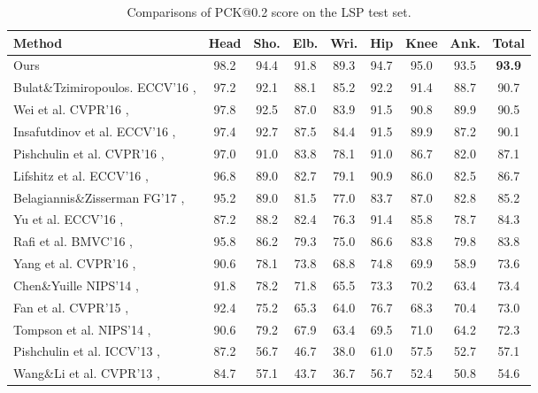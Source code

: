 \documentclass[journal ]{IEEEtran}
\begin{document}
\begin{table*}[t]
	\footnotesize
\tabcolsep=0.2cm
	\begin{center}
		\begin{tabular}{l c c c c c c c c}
			\hline 
			Method & Head & Sho. & Elb. & Wri. & Hip & Knee & Ank. & Total \\ [0.2ex]
			\hline
Ours & 98.2  & 94.4  & 91.8  & 89.3  & 94.7  & 95.0 & 93.5 & \textbf{93.9} \\
			\hline
			
Bulat\&Tzimiropoulos. ECCV'16 \cite{bulat2016human},  &97.2 &92.1 &88.1 &85.2 &92.2 &91.4 &88.7 &90.7 \\
			Wei et al. CVPR'16 \cite{wei2016convolutional}, &97.8 &92.5 &87.0 &83.9 &91.5 &90.8 &89.9 &90.5 \\
			Insafutdinov et al. ECCV'16 \cite{insafutdinov2016deepercut}, &97.4 &92.7 &87.5 &84.4 &91.5 &89.9 &87.2 &90.1 \\
			Pishchulin et al. CVPR'16 \cite{pishchulin2016deepcut},  &97.0 &91.0 &83.8 &78.1 &91.0 &86.7 &82.0 &87.1 \\
			Lifshitz et al. ECCV'16 \cite{lifshitz2016human}, &96.8 &89.0 &82.7 &79.1 &90.9 &86.0 &82.5 &86.7 \\
			Belagiannis\&Zisserman FG'17 \cite{belagiannis2016recurrent}, &95.2 &89.0 &81.5 &77.0 &83.7 &87.0 &82.8 &85.2 \\
			Yu et al. ECCV'16 \cite{yu2016deep},  &87.2 &88.2 &82.4 &76.3 &91.4 &85.8 &78.7 &84.3 \\
			Rafi et al. BMVC'16 \cite{rafi2016efficient},  &95.8 &86.2 &79.3 &75.0 &86.6 &83.8 &79.8 &83.8 \\
			Yang et al. CVPR'16 \cite{yang2016end}, &90.6 &78.1 &73.8 &68.8 &74.8 &69.9 &58.9 &73.6 \\
			Chen\&Yuille NIPS'14 \cite{chen2014articulated}, &91.8 &78.2 &71.8 &65.5 &73.3 &70.2 &63.4 &73.4 \\
			Fan et al. CVPR'15 \cite{fan2015combining}, &92.4 &75.2 &65.3 &64.0 &76.7 &68.3 &70.4 &73.0 \\
			Tompson et al. NIPS'14 \cite{tompson2014joint}, &90.6 &79.2 &67.9 &63.4 &69.5 &71.0 &64.2 &72.3 \\
			Pishchulin et al. ICCV'13 \cite{pishchulin2013strong}, &87.2 &56.7 &46.7 &38.0 &61.0 &57.5 &52.7 &57.1 \\
			Wang\&Li et al. CVPR'13 \cite{fwang2013pose}, &84.7 &57.1 &43.7 &36.7 &56.7 &52.4 &50.8 &54.6 \\
\hline
\end{tabular}
	\end{center}
	
	\caption{Comparisons of PCK@0.2 score on the LSP test set.}
	\label{table:LSP-results}
\end{table*}
\end{document}
